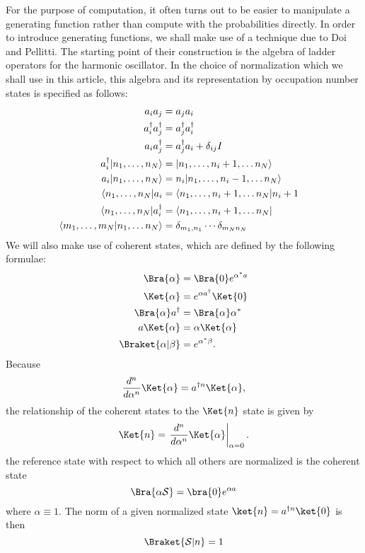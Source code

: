 For the purpose of computation, it often turns out to be easier to
manipulate a generating function rather than compute with the
probabilities directly.  In order to introduce generating functions, we
shall make use of a technique due to Doi and Pellitti.  The starting
point of their construction is the algebra of ladder operators for the
harmonic oscillator.  In the choice of normalization which we shall use
in this article, this algebra and its representation by occupation
number states is specified as follows:
\begin{align*}
a_i a_j &= a_j a_i \cr
a^\dagger_i a^\dagger_j &= a^\dagger_j a^\dagger_i \cr
a_i a^\dagger_j &= a^\dagger_j a_i + \delta_{ij} I \cr
a^\dagger_i |n_1, \ldots, n_N \rangle &=
|n_1, \ldots, n_i + 1, \ldots n_N \rangle \cr
a_i |n_1, \ldots, n_N \rangle &=
n_i |n_1, \ldots, n_i - 1, \ldots n_N \rangle \cr
\langle n_1, \ldots, n_N | a_i &=
\langle n_1, \ldots, n_i + 1, \ldots n_N | n_i +1 \cr
\langle n_1, \ldots, n_N | a^\dagger_i &=
\langle n_1, \ldots, n_i + 1, \ldots n_N | \cr
\langle m_1, \ldots, m_N | n_1, \ldots n_N \rangle &=
\delta_{m_1,n_1} \cdots \delta_{m_N n_N}
\end{align*}
We will also make use of coherent states, which are defined by the
following formulae:
\begin{align*}
\Bra{\alpha} &= \Bra{0} e^{\alpha^* a} \\
\Ket{\alpha} &= e^{\alpha a^{\dagger}} \Ket{0}\\
\Bra{\alpha}a^\dagger &= \Bra{\alpha}\alpha^*\\
a \Ket{\alpha} &= \alpha \Ket{\alpha}\\
\Braket{\alpha|\beta} &= e^{\alpha^* \beta}.
\end{align*}
Because
$$
\frac{d^n}{d \alpha^n} \Ket{\alpha} = a^{\dagger n} \Ket{\alpha},
$$
the relationship of the coherent states to the $\Ket{n}$ state is given by
$$
\Ket{n} = \left. \frac{d^n}{d \alpha^n} \Ket{\alpha} \right|_{\alpha=0}.
$$
the reference state with respect to which all others are normalized is the coherent state
$$\Bra{\alpha \mathcal{S}} = \bra{0}e^{\alpha a}$$
where $\alpha\equiv1$. The norm of a given normalized state $\ket{n}=a^{\dagger n} \ket{0}$ is then
$$\Braket{\mathcal{S}|n}=1$$

